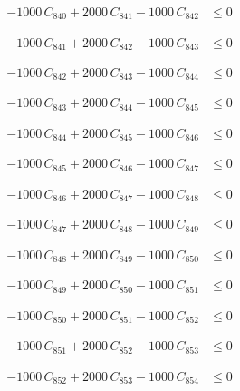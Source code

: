 \documentclass[a4paper,11pt]{article}
\begin{document}
\begin{align}
-1000\,C_{840} + 2000\,C_{841} - 1000\,C_{842} &\leq 0 \nonumber
\end{align}

\begin{align}
-1000\,C_{841} + 2000\,C_{842} - 1000\,C_{843} &\leq 0 \nonumber
\end{align}

\begin{align}
-1000\,C_{842} + 2000\,C_{843} - 1000\,C_{844} &\leq 0 \nonumber
\end{align}

\begin{align}
-1000\,C_{843} + 2000\,C_{844} - 1000\,C_{845} &\leq 0 \nonumber
\end{align}

\begin{align}
-1000\,C_{844} + 2000\,C_{845} - 1000\,C_{846} &\leq 0 \nonumber
\end{align}

\begin{align}
-1000\,C_{845} + 2000\,C_{846} - 1000\,C_{847} &\leq 0 \nonumber
\end{align}

\begin{align}
-1000\,C_{846} + 2000\,C_{847} - 1000\,C_{848} &\leq 0 \nonumber
\end{align}

\begin{align}
-1000\,C_{847} + 2000\,C_{848} - 1000\,C_{849} &\leq 0 \nonumber
\end{align}

\begin{align}
-1000\,C_{848} + 2000\,C_{849} - 1000\,C_{850} &\leq 0 \nonumber
\end{align}

\begin{align}
-1000\,C_{849} + 2000\,C_{850} - 1000\,C_{851} &\leq 0 \nonumber
\end{align}

\begin{align}
-1000\,C_{850} + 2000\,C_{851} - 1000\,C_{852} &\leq 0 \nonumber
\end{align}

\begin{align}
-1000\,C_{851} + 2000\,C_{852} - 1000\,C_{853} &\leq 0 \nonumber
\end{align}

\begin{align}
-1000\,C_{852} + 2000\,C_{853} - 1000\,C_{854} &\leq 0 \nonumber
\end{align}
\end{document}
